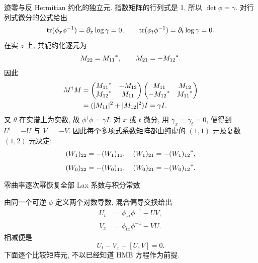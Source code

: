 \par\smallskip\noindent 迹零与反 Hermitian 约化的独立元.\quad
指数矩阵的行列式是 1, 所以 $\det\phi=\gamma$.
对行列式微分的公式给出
\begin{equation*}
\operatorname{tr}(\phi_x\phi^{-1})=\partial_x\log\gamma=0,\qquad
\operatorname{tr}(\phi_t\phi^{-1})=\partial_t\log\gamma=0.
\end{equation*}
在实 $z$ 上, 共轭约化逐元为
\begin{equation*}
M_{22}={M_{11}}^{*},\qquad
M_{21}=-{M_{12}}^{*}.
\end{equation*}
因此
\begin{equation*}
\begin{aligned}
M^\dagger M
&=\begin{pmatrix}
{M_{11}}^{*}&-M_{12}\\
{M_{12}}^{*}&M_{11}
\end{pmatrix}
\begin{pmatrix}
M_{11}&M_{12}\\
-{M_{12}}^{*}&{M_{11}}^{*}
\end{pmatrix}\\
&=(|M_{11}|^2+|M_{12}|^2)I=\gamma I.
\end{aligned}
\end{equation*}
又 $\theta$ 在实谱上为实数, 故 $\phi^\dagger\phi=\gamma I$.
对 $x$ 或 $t$ 微分, 用 $\gamma_x=\gamma_t=0$,
便得到 $ U^\dagger=- U$ 与
$ V^\dagger=- V$.
因此每个多项式系数矩阵都由纯虚的 $(1,1)$ 元及复数 $(1,2)$ 元决定:
\begin{equation*}
(W_1)_{22}=-(W_1)_{11},\quad
(W_1)_{21}=-{(W_1)_{12}}^{*},
\end{equation*}
\begin{equation*}
(W_0)_{22}=-(W_0)_{11},\quad
(W_0)_{21}=-{(W_0)_{12}}^{*}.
\end{equation*}

\par\medskip\noindent 零曲率逐次幂恢复全部 Lax 系数与积分常数\par
由同一个可逆 $\phi$ 定义两个对数导数,
混合偏导交换给出
\begin{equation*}
\begin{aligned}
 U_t
&=\phi_{xt}\phi^{-1}- U V,\\
 V_x
&=\phi_{tx}\phi^{-1}- V U.
\end{aligned}
\end{equation*}
相减便是
\begin{equation*}
 U_t- V_x+[ U, V]=0.
\end{equation*}
下面逐个比较矩阵元, 不以已经知道 HMB 方程作为前提.

